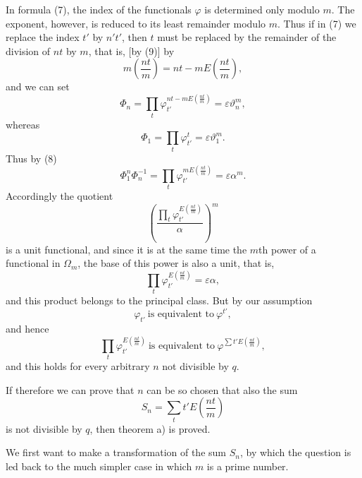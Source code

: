 \documentclass[11pt]{article}
\begin{document}
In formula (7), the index of the functionals $\varphi$ is determined only modulo $m$. The exponent, however, is reduced to its least remainder modulo $m$. Thus if in (7) we replace the index $t'$ by $n't'$, then $t$ must be replaced by the remainder of the division of $nt$ by $m$, that is, [by (9)] by
\[
m\left(\frac{nt}{m}\right)=nt-mE\left(\frac{nt}{m}\right),
\]
and we can set
\[
\Phi_n=\prod_t \varphi_{t'}^{nt-mE(\frac{nt}{m})}=\varepsilon\vartheta_n^m,
\]
whereas
\[
\Phi_1=\prod_t \varphi_{t'}^t=\varepsilon\vartheta_1^m.
\]
Thus by (8)
\begin{equation}
\Phi_1^n\Phi_n^{-1}=\prod_t \varphi_{t'}^{mE(\frac{nt}{m})}=\varepsilon\alpha^m.
\tag{10}
\end{equation}
Accordingly the quotient
\[
\left(\frac{\prod_t \varphi_{t'}^{E(\frac{nt}{m})}}{\alpha}\right)^m
\]
is a unit functional, and since it is at the same time the $m$th power of a functional in $\Omega_m$, the base of this power is also a unit, that is,
\[
\prod_t \varphi_{t'}^{E(\frac{nt}{m})}=\varepsilon\alpha,
\]
and this product belongs to the principal class. But by our assumption
\[
\varphi_{t'}\ \text{is equivalent to}\ \varphi^{t'},
\]
and hence
\[
\prod_t \varphi_{t'}^{E(\frac{nt}{m})}\ \text{is equivalent to}\ \varphi^{\sum t'E(\frac{nt}{m})},
\]
and this holds for every arbitrary $n$ not divisible by $q$.

If therefore we can prove that $n$ can be so chosen that also the sum
\[
S_n=\sum_t t'E\left(\frac{nt}{m}\right)
\]
is not divisible by $q$, then theorem a) is proved.

We first want to make a transformation of the sum $S_n$, by which the question is led back to the much simpler case in which $m$ is a prime number.
\end{document}
